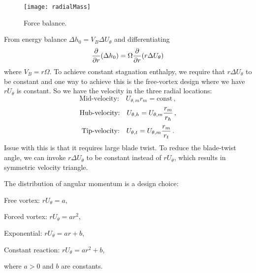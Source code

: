 \begin{figure}[!htb!]
 \centering
    {\texttt{[image: radialMass]}}
    \caption{\label{fig:radial_mass}Force balance.}
\end{figure}

From energy balance $\Delta h_0 = V_B \Delta U_\theta$ and differentiating
\begin{equation}
  {\frac{\partial}{\partial r}} (\Delta h_0) = \Omega {\frac{\partial}{\partial r}} (r \Delta U_\theta)
\end{equation}
where $V_B = r \Omega$. To achieve constant stagnation enthalpy, we require that $r\Delta U_\theta$ to be constant and one way to achieve this is the free-vortex design where we have $r U_\theta$ is constant. So we have the velocity in the three radial locations:
\begin{equation}
  \text{Mid-velocity:} \quad U_{\theta, m} r_m = \text{const}\,,
\end{equation}
\begin{equation}
  \text{Hub-velocity:} \quad U_{\theta, h} = U_{\theta, m} {\frac{r_m}{r_h}}\,,
\end{equation}
\begin{equation}
  \text{Tip-velocity:} \quad U_{\theta, t} = U_{\theta, m} {\frac{r_m}{r_t}}\,.
\end{equation}
Issue with this is that it requires large blade twist. To reduce the blade-twist angle, we can invoke $r \Delta U_\theta$ to be constant instead of $r U_\theta$, which results in symmetric velocity triangle.

The distribution of angular momentum is a design choice:
\begin{itemizePacked}
\item Free vortex: $rU_\theta = a$,
\item Forced vortex: $rU_\theta = a r^2$,
\item Exponential: $rU_\theta = a r + b$,
\item Constant reaction: $rU_\theta = a r^2 + b$,
\end{itemizePacked}
where $a > 0$ and $b$ are constants.

